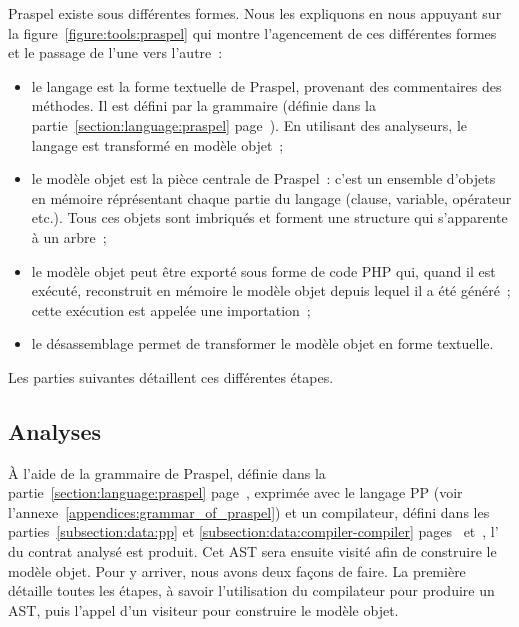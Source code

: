 Praspel existe sous différentes formes. Nous les expliquons en nous appuyant sur
la figure~\ref{figure:tools:praspel} qui montre l'agencement de ces différentes
formes et le passage de l'une vers l'autre~:
%
\begin{itemize}

\item le langage est la forme textuelle de Praspel, provenant des commentaires
des méthodes. Il est défini par la grammaire (définie dans la
partie~\ref{section:language:praspel} page~\pageref{section:language:praspel}).
En utilisant des analyseurs, le langage est transformé en modèle objet~;

\item le modèle objet  est la pièce centrale de Praspel~: c'est un
ensemble d'objets en mémoire réprésentant chaque partie du langage (clause,
variable, opérateur etc.). Tous ces objets sont imbriqués et forment une
structure qui s'apparente à un arbre~;

\item le modèle objet peut être exporté sous forme de code PHP qui, quand il est
exécuté, reconstruit en mémoire le modèle objet depuis lequel il a été généré~;
cette exécution est appelée une importation~;

\item le désassemblage permet de transformer le modèle objet en forme textuelle.

\end{itemize}
%
Les parties suivantes détaillent ces différentes étapes.

\subsection{Analyses}
\label{subsection:tools:interpretation}

À l'aide de la grammaire de Praspel, définie dans la
partie~\ref{section:language:praspel} page~\pageref{section:language:praspel},
exprimée avec le langage PP (voir l'annexe~\ref{appendices:grammar_of_praspel})
et un compilateur, défini dans les parties~\ref{subsection:data:pp} et
\ref{subsection:data:compiler-compiler} pages~\pageref{subsection:data:pp}
et~\pageref{subsection:data:compiler-compiler}, l' du contrat analysé est produit. Cet AST sera ensuite visité afin de
construire le modèle objet. Pour y arriver, nous avons deux façons de faire. La
première détaille toutes les étapes, à savoir l'utilisation du compilateur pour
produire un AST, puis l'appel d'un visiteur pour construire le modèle objet.

